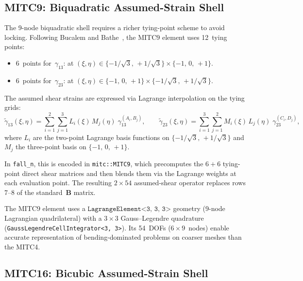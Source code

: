 \subsection{MITC9: Biquadratic Assumed-Strain Shell}
\label{sec:mitc9}

The 9-node biquadratic shell requires a richer tying-point scheme to
avoid locking.  Following Bucalem and Bathe~\cite{BucalemBathe1993},
the MITC9 element uses 12~tying points:

\begin{itemize}
  \item 6~points for~$\gamma_{13}$: at
        $(\xi,\eta) \in \{-1/\sqrt{3},\, +1/\sqrt{3}\}
         \times \{-1,\, 0,\, +1\}$.
  \item 6~points for~$\gamma_{23}$: at
        $(\xi,\eta) \in \{-1,\, 0,\, +1\}
         \times \{-1/\sqrt{3},\, +1/\sqrt{3}\}$.
\end{itemize}

The assumed shear strains are expressed via Lagrange interpolation
on the tying grids:
\begin{equation}
  \tilde{\gamma}_{13}(\xi,\eta)
  = \sum_{i=1}^{2}\sum_{j=1}^{3}
    L_i(\xi) \, M_j(\eta) \;
    \gamma_{13}^{(A_i, B_j)}
  ,
  \qquad
  \tilde{\gamma}_{23}(\xi,\eta)
  = \sum_{i=1}^{3}\sum_{j=1}^{2}
    M_i(\xi) \, L_j(\eta) \;
    \gamma_{23}^{(C_i, D_j)}
  ,
  \label{eq:mitc9-assumed}
\end{equation}
where $L_i$ are the two-point Lagrange basis functions on
$\{-1/\sqrt{3},\, +1/\sqrt{3}\}$ and $M_j$ the three-point basis
on $\{-1,\, 0,\, +1\}$.

In \texttt{fall\_n}, this is encoded in \texttt{mitc::MITC9}, which
precomputes the $6 + 6$ tying-point direct shear matrices and then
blends them via the Lagrange weights at each evaluation point.  The
resulting $2 \times 54$ assumed-shear operator replaces rows 7--8 of
the standard~$\mathbf{B}$ matrix.

The MITC9 element uses a
$\texttt{LagrangeElement<3, 3, 3>}$ geometry (9-node Lagrangian
quadrilateral) with a $3 \times 3$ Gauss--Legendre quadrature
(\texttt{GaussLegendreCellIntegrator<3, 3>}).  Its 54~DOFs
($6 \times 9$~nodes) enable accurate representation of bending-dominated
problems on coarser meshes than the MITC4.

\subsection{MITC16: Bicubic Assumed-Strain Shell}
\label{sec:mitc16}

